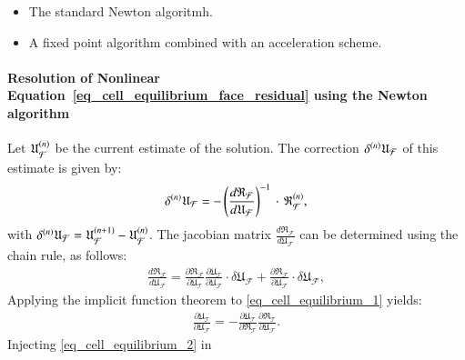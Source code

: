 \begin{itemize}
  \item The standard Newton algoritmh.
  \item A fixed point algorithm combined with an acceleration scheme.
\end{itemize}

\paragraph{Resolution of Nonlinear Equation~\eqref{eq_cell_equilibrium_face_residual} using the Newton algorithm}

Let \(\iter{n}{\mathfrak{U}_{\mathcal{F}}}\) be the current estimate
of the solution. The correction
\(\iter{n}{\delta}\mathfrak{U}_{\mathcal{F}}\) of this estimate is given
by:
\[
\iter{n}{\delta}\mathfrak{U}_{\mathcal{F}}=
-\left( \frac{d\mathfrak{R}_{\mathcal{F}}}{d \mathfrak{U}_{\mathcal{F}}}
\right)^{-1} \,\cdot\,\iter{n}{\mathfrak{R}}_{\mathcal{F}},
\]
with
\(\iter{n}{\delta}\mathfrak{U}_{\mathcal{F}}=\iter{n+1}{\mathfrak{U}_{\mathcal{F}}}-\iter{n}{\mathfrak{U}_{\mathcal{F}}}\).
%
%
%
The jacobian matrix \(\frac{d\mathfrak{R}_{\mathcal{F}}}{d
  \mathfrak{U}_{\mathcal{F}}}\) can be determined using the chain rule,
as follows:
\begin{equation}
  \label{eq_cell_equilibrium_0}
  \begin{aligned}
    \frac{d\mathfrak{R}_{\mathcal{F}}}{d
      \mathfrak{U}_{\mathcal{F}}}
    = \frac{\partial
      \mathfrak{R}_{\mathcal{F}}}{\partial \mathfrak{U}_{\mathcal{T}}}
    \frac{\partial \mathfrak{U}_{\mathcal{T}}}{\partial
      \mathfrak{U}_{\mathcal{F}}} \cdot \delta
    \mathfrak{U}_{\mathcal{F}} + \frac{\partial
      \mathfrak{R}_{\mathcal{F}}}{\partial \mathfrak{U}_{\mathcal{F}}}
    \cdot \delta \mathfrak{U}_{\mathcal{F}},
  \end{aligned}
\end{equation}
Applying the implicit function theorem to
\eqref{eq_cell_equilibrium_1} yields:
\begin{equation}
  \label{eq_cell_equilibrium_2}
  \begin{aligned}
    \frac{\partial
      \mathfrak{U}_{\mathcal{T}}}{\partial \mathfrak{U}_{\mathcal{F}}} =
    - \frac{\partial \mathfrak{U}_{\mathcal{T}}}{\partial
      \mathfrak{R}_{\mathcal{T}}} \frac{\partial
      \mathfrak{R}_{\mathcal{T}}}{\partial \mathfrak{U}_{\mathcal{F}}}.
  \end{aligned}
\end{equation}
Injecting \eqref{eq_cell_equilibrium_2} in
